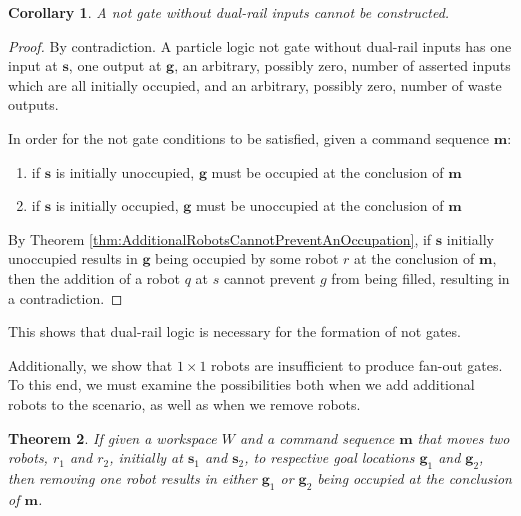 \documentclass[letterpaper, 10 pt, conference]{ieeeconf}
\newtheorem{theorem}{Theorem}
\newtheorem{corollary}[theorem]{Corollary}
\begin{document}
\begin{corollary}
A  {\sc not} gate without dual-rail inputs cannot be constructed.
\end{corollary}
\begin{proof}
By contradiction.
A particle logic {\sc not} gate without dual-rail inputs has one input at $\bm{s}$, one output at $\bm{g}$, an arbitrary, possibly zero, number of asserted inputs which are all initially occupied, and an arbitrary, possibly zero, number of waste outputs.

In order for the {\sc not} gate conditions to be satisfied, given a command sequence $\bm{m}$:  
\begin{enumerate}
\item if $\bm{s}$ is initially unoccupied, $\bm{g}$ must be occupied at the conclusion of $\bm{m}$
\item if $\bm{s}$ is initially occupied, $\bm{g}$ must be unoccupied at the conclusion of $\bm{m}$ 
\end{enumerate}
By Theorem \ref{thm:AdditionalRobotsCannotPreventAnOccupation}, if $\bm{s}$ initially unoccupied results in $\bm{g}$ being occupied by some robot $r$ at the conclusion of $\bm{m}$, then the addition of a robot $q$ at $s$ cannot prevent $g$ from being filled, resulting in a contradiction.
\end{proof}

This shows that dual-rail logic is necessary for the formation of {\sc not} gates. 

Additionally, we show that $1\times1$ robots are insufficient to produce fan-out gates. To this end, we must examine the possibilities both when we add additional robots to the scenario, as well as when we remove robots.  

\begin{theorem}\label{thm:TwoRobotsTwoGoalsImpliesOneRobotOneGoal} 
If given a workspace $W$ and a command sequence $\bm{m}$ that moves two robots, $r_1$ and $r_2$, initially at $\bm{s}_1$ and $\bm{s}_2$, to respective goal locations $\bm{g}_1$ and $\bm{g}_2$, then removing one robot results in either $\bm{g}_1$ or $\bm{g}_2$ being occupied at the conclusion of $\bm{m}$.
\end{theorem}
\end{document}

